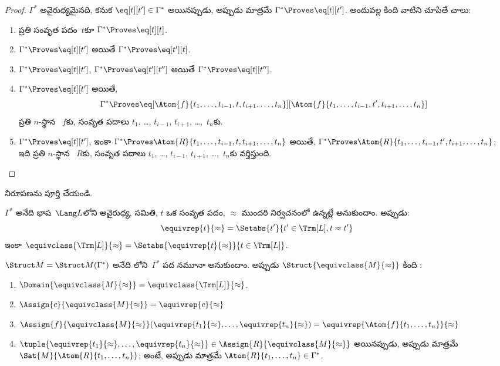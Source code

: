 \documentclass[../../../include/open-logic-section]{subfiles}
\begin{document}
\begin{proof}
$\Gamma^*$ అవైరుధ్యమైనది,  కనుక $\eq[t][t'] \in
\Gamma^*$ అయినప్పుడు, అప్పుడు మాత్రమే $\Gamma^* \Proves \eq[t][t']$.
అందువల్ల కింది వాటిని చూపితే చాలు:
\begin{enumerate}
\item ప్రతి సంవృత పదం~$t$కూ $\Gamma^* \Proves \eq[t][t]$.
\item $\Gamma^* \Proves \eq[t][t']$ అయితే $\Gamma^* \Proves
  \eq[t'][t]$.
\item $\Gamma^* \Proves \eq[t][t']$, $\Gamma^* \Proves
  \eq[t'][t'']$ అయితే $\Gamma^* \Proves \eq[t][t'']$.
\item $\Gamma^* \Proves \eq[t][t']$ అయితే,
\[
\Gamma^* \Proves
\eq[\Atom{f}{t_1,\dots,t_{i-1},t,t_{i+1},\dots,t_n}][\Atom{f}{t_1,\dots,t_{i-1},t',t_{i+1},\dots,t_n}]
\]
ప్రతి $n$-స్థాన ~$f$కు, సంవృత పదాలు $t_1$, \dots,
$t_{i-1}$, $t_{i+1}$, \dots,~$t_n$కు.
\item $\Gamma^* \Proves \eq[t][t']$, ఇంకా
$\Gamma^* \Proves
\Atom{R}{t_1,\dots,t_{i-1},t,t_{i+1},\dots,t_n}$ అయితే,
$\Gamma^* \Proves \Atom{R}{t_1,\dots,t_{i-1},t',t_{i+1},\dots,t_n}$;
ఇది ప్రతి $n$-స్థాన ~$R$కు, సంవృత పదాలు $t_1$, \dots,
$t_{i-1}$, $t_{i+1}$, \dots,~$t_n$కు వర్తిస్తుంది.
\end{enumerate}
\end{proof}

\begin{prob}
 నిరూపణను పూర్తి చేయండి.
\end{prob}

\begin{defn}
$\Gamma^*$ అనేది భాష~$\Lang L$లోని అవైరుధ్య,  సమితి,
$t$ ఒక సంవృత పదం, $\approx$ ముందరి నిర్వచనంలో ఉన్నట్లే అనుకుందాం.
అప్పుడు:
\[
\equivrep{t}{\approx} = \Setabs{t'}{t'\in \Trm[L], t \approx t'}
\]
ఇంకా $\equivclass{\Trm[L]}{\approx} = \Setabs{\equivrep{t}{\approx}}{t \in \Trm[L]}$.
\end{defn}

\begin{defn}
$\Struct M = \Struct M(\Gamma^*)$ అనేది 
లోని~$\Gamma^*$ పద నమూనా అనుకుందాం. అప్పుడు
$\Struct{\equivclass{M}{\approx}}$ కింది :
\begin{enumerate}
\item $\Domain{\equivclass{M}{\approx}} = \equivclass{\Trm[L]}{\approx}$.
\item $\Assign{c}{\equivclass{M}{\approx}} = \equivrep{c}{\approx}$
\item $\Assign{f}{\equivclass{M}{\approx}}(\equivrep{t_1}{\approx}, \dots,
  \equivrep{t_n}{\approx}) = \equivrep{\Atom{f}{t_1,\dots, t_n}}{\approx}$
\item $\tuple{\equivrep{t_1}{\approx}, \dots, \equivrep{t_n}{\approx}} \in
  \Assign{R}{\equivclass{M}{\approx}}$ అయినప్పుడు, అప్పుడు మాత్రమే
  $\Sat{M}{\Atom{R}{t_1,\dots, t_n}}$; అంటే, అప్పుడు మాత్రమే
  $\Atom{R}{t_1,\dots, t_n} \in \Gamma^*$.
\end{enumerate}
\end{defn}
\end{document}
